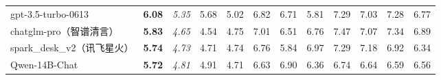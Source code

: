 \begin{table}[t]
{\begin{tabular}{@{}l|c|ccc|ccccccc@{}}
gpt-3.5-turbo-0613              & \textbf{6.08}                     & \multicolumn{1}{c|}{\textit{5.35}}                                   & 5.68                                            & 5.02                                            & \multicolumn{1}{c|}{6.82}                                            & 6.71                                            & 5.81                                            & 7.29                                            & 7.03                                            & 7.28                                            & 6.77                                            \\
chatglm-pro（智谱清言）           & \textbf{5.83}                     & \multicolumn{1}{c|}{\textit{4.65}}                                   & 4.54                                            & 4.75                                            & \multicolumn{1}{c|}{7.01}                                            & 6.51                                            & 6.76                                            & 7.47                                            & 7.07                                            & 7.34                                            & 6.89                                            \\
spark\_desk\_v2（讯飞星火）       & \textbf{5.74}                     & \multicolumn{1}{c|}{\textit{4.73}}                                   & 4.71                                            & 4.74                                            & \multicolumn{1}{c|}{6.76}                                            & 5.84                                            & 6.97                                            & 7.29                                            & 7.18                                            & 6.92                                            & 6.34                                            \\
Qwen-14B-Chat                   & \textbf{5.72}                     & \multicolumn{1}{c|}{\textit{4.81}}                                   & 4.91                                            & 4.71                                            & \multicolumn{1}{c|}{6.63}                                            & 6.90                                            & 6.36                                            & 6.74                                            & 6.64                                            & 6.59                                            & 6.56                                            \\

\end{tabular}}
\end{table}
